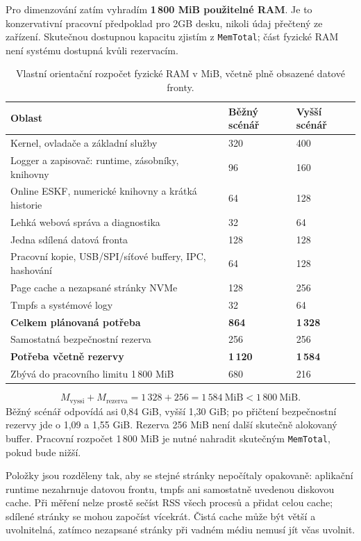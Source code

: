 \documentclass[11pt,a4paper]{article}
\begin{document}
Pro dimenzování zatím vyhradím \textbf{1\,800 MiB použitelné RAM}. Je to konzervativní pracovní předpoklad pro 2GB desku, nikoli údaj přečtený ze zařízení. Skutečnou dostupnou kapacitu zjistím z \texttt{MemTotal}; část fyzické RAM není systému dostupná kvůli rezervacím.\cite{procmem}

\begin{table}[htbp]\centering\small
\caption{Vlastní orientační rozpočet fyzické RAM v MiB, včetně plně obsazené datové fronty.}\label{tab:ram-total}
\begin{tabularx}{\textwidth}{Y L{24mm}L{24mm}}
\toprule Oblast & Běžný scénář & Vyšší scénář\\\midrule
Kernel, ovladače a základní služby & 320 & 400\\
Logger a zapisovač: runtime, zásobníky, knihovny & 96 & 160\\
Online ESKF, numerické knihovny a krátká historie & 64 & 128\\
Lehká webová správa a diagnostika & 32 & 64\\
Jedna sdílená datová fronta & 128 & 128\\
Pracovní kopie, USB/SPI/síťové buffery, IPC, hashování & 64 & 128\\
Page cache a nezapsané stránky NVMe & 128 & 256\\
Tmpfs a systémové logy & 32 & 64\\\midrule
\textbf{Celkem plánovaná potřeba} & \textbf{864} & \textbf{1\,328}\\
Samostatná bezpečnostní rezerva & 256 & 256\\
\textbf{Potřeba včetně rezervy} & \textbf{1\,120} & \textbf{1\,584}\\
Zbývá do pracovního limitu 1\,800 MiB & 680 & 216\\
\bottomrule\end{tabularx}\end{table}

\begin{equation}
M_{\mathrm{vyssi}}+M_{\mathrm{rezerva}}
=1\,328+256=1\,584\ \mathrm{MiB}<1\,800\ \mathrm{MiB}.
\end{equation}
Běžný scénář odpovídá asi 0,84 GiB, vyšší 1,30 GiB; po přičtení bezpečnostní rezervy jde o 1,09 a 1,55 GiB. Rezerva 256 MiB není další skutečně alokovaný buffer. Pracovní rozpočet 1\,800 MiB je nutné nahradit skutečným \texttt{MemTotal}, pokud bude nižší.

Položky jsou rozděleny tak, aby se stejné stránky nepočítaly opakovaně: aplikační runtime nezahrnuje datovou frontu, tmpfs ani samostatně uvedenou diskovou cache. Při měření nelze prostě sečíst RSS všech procesů a přidat celou cache; sdílené stránky se mohou započíst vícekrát. Čistá cache může být větší a uvolnitelná, zatímco nezapsané stránky při vadném médiu nemusí jít včas uvolnit.\cite{procmem}
\end{document}

